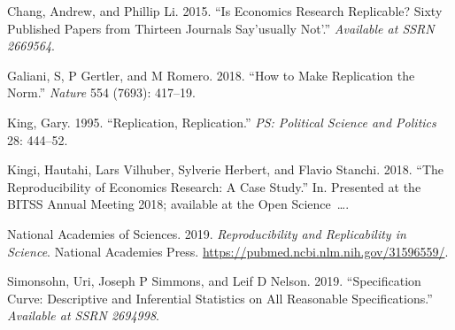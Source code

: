 \documentclass[
  openany]{book}
\newlength{\cslhangindent}
\newlength{\cslentryspacingunit} %
\newenvironment{CSLReferences}[2] %
 {%
  \setlength{\parindent}{0pt}
  \ifodd #1
  \let\oldpar\par
  \def\par{\hangindent=\cslhangindent\oldpar}
  \fi
  \setlength{\parskip}{#2\cslentryspacingunit}
 }%
 {}
\begin{document}
\hypertarget{refs}{}
\begin{CSLReferences}{1}{0}
\leavevmode{}%
Chang, Andrew, and Phillip Li. 2015. {``Is Economics Research Replicable? Sixty Published Papers from Thirteen Journals Say'usually Not'.''} \emph{Available at SSRN 2669564}.

\leavevmode{}%
Galiani, S, P Gertler, and M Romero. 2018. {``How to Make Replication the Norm.''} \emph{Nature} 554 (7693): 417--19.

\leavevmode{}%
King, Gary. 1995. {``Replication, Replication.''} \emph{PS: Political Science and Politics} 28: 444--52.

\leavevmode{}%
Kingi, Hautahi, Lars Vilhuber, Sylverie Herbert, and Flavio Stanchi. 2018. {``The Reproducibility of Economics Research: A Case Study.''} In. Presented at the BITSS Annual Meeting 2018; available at the Open Science~\ldots.

\leavevmode{}%
National Academies of Sciences. 2019. \emph{Reproducibility and Replicability in Science}. National Academies Press. \url{https://pubmed.ncbi.nlm.nih.gov/31596559/}.

\leavevmode{}%
Simonsohn, Uri, Joseph P Simmons, and Leif D Nelson. 2019. {``Specification Curve: Descriptive and Inferential Statistics on All Reasonable Specifications.''} \emph{Available at SSRN 2694998}.

\end{CSLReferences}
\end{document}
